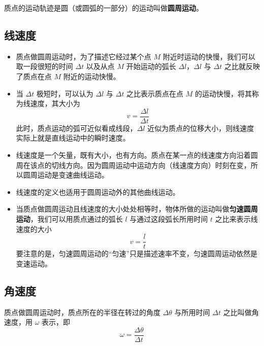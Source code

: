 

质点的运动轨迹是圆（或圆弧的一部分）的运动叫做\textbf{圆周运动}。

\subsection{线速度}

\begin{itemize}
\item 质点做圆周运动时，为了描述它经过某个点 $M$ 附近时运动的快慢，我们可以取一段很短的时间 $\Delta t$ 以及从点 $M$ 开始运动的弧长 $\Delta l$，$\Delta l$ 与 $\Delta t$ 之比就反映了质点在点 $M$ 附近的运动快慢。

\item 当 $\Delta t$ 极短时，可以认为 $\Delta l$ 与 $\Delta t$ 之比表示质点在点 $M$ 的运动快慢，将其称为线速度，其大小为
\begin{equation}
v=\frac{\Delta l}{\Delta t}
\end{equation}
此时，质点运动的弧可近似看成线段，$\Delta l$ 近似为质点的位移大小，则线速度实际上就是直线运动中的瞬时速度。

\item 线速度是一个矢量，既有大小，也有方向。质点在某一点的线速度方向沿着圆周在该点的切线方向。因为圆周运动中运动方向（线速度方向）时刻在变，所以圆周运动是变速曲线运动。

\item 线速度的定义也适用于圆周运动外的其他曲线运动。

\item 当质点做圆周运动且线速度的大小处处相等时，物体所做的运动叫做\textbf{匀速圆周运动}，我们可以用质点通过的弧长 $l$ 与通过这段弧长所用时间 $t$ 之比来表示线速度的大小
\begin{equation}
v=\frac{l}{t}
\end{equation}
要注意的是，匀速圆周运动的“匀速”只是描述速率不变，匀速圆周运动依然是变速运动。
\end{itemize}

\subsection{角速度}

质点做圆周运动时，质点所在的半径在转过的角度 $\Delta \theta$ 与所用时间 $\Delta t$ 之比叫做角速度，用 $\omega$ 表示，即
\begin{equation}
\omega = \frac{\Delta \theta}{\Delta t}
\end{equation}

